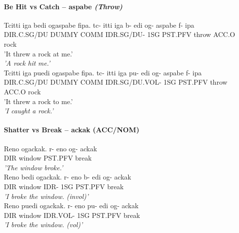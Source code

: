 \documentclass[11pt]{article}
\begin{document}
\paragraph{Be Hit vs Catch – aspabe \textit{(Throw)}}
\begin{exe}
\ex \label{fall}
\begin{xlist}
\ex \label{fall:invol}
Tcitti iga bedi ogaspabe fipa.
\gll
tc-         itti  iga  b-         edi og-     aspabe f-    ipa\\
DIR.C.SG/DU DUMMY COMM IDR.SG/DU- 1SG PST.PFV throw  ACC.O rock\\
\trans 
    {\textthin{}'It threw a rock at me.'}\\
    \textit{'A rock hit me.'}\\

\ex \label{fall:vol}
Tcitti iga puedi ogaspabe fipa.
\gll
tc-         itti  iga  pu-            edi og-     aspabe f-    ipa\\
DIR.C.SG/DU DUMMY COMM IDR.SG/DU.VOL- 1SG PST.PFV throw  ACC.O rock\\
\trans 
    {\textthin{}'It threw a rock to me.'}\\
    \textit{'I caught a rock.'}\\
\end{xlist}
\end{exe}


\newpage

\paragraph{Shatter vs Break – ackak (ACC/NOM)}
\begin{exe}
\ex \label{break:S}
\begin{xlist}
\ex \label{fall:invol}
Reno ogackak.
\gll
r-  eno    og-     ackak\\
DIR window PST.PFV break\\
\trans 
    \textit{'The window broke.'}\\

\ex \label{break:AN}
Reno bedi ogackak.
\gll
r-  eno    b-   edi og-     ackak\\
DIR window IDR- 1SG PST.PFV break\\
\trans 
    \textit{'I broke the window. (invol)'}\\

\ex \label{break:EA}
Reno puedi ogackak.
\gll
r-  eno    pu-      edi og-     ackak\\
DIR window IDR.VOL- 1SG PST.PFV break\\
\trans
    \textit{'I broke the window. (vol)'}\\
\end{xlist}
\end{exe}
\end{document}
